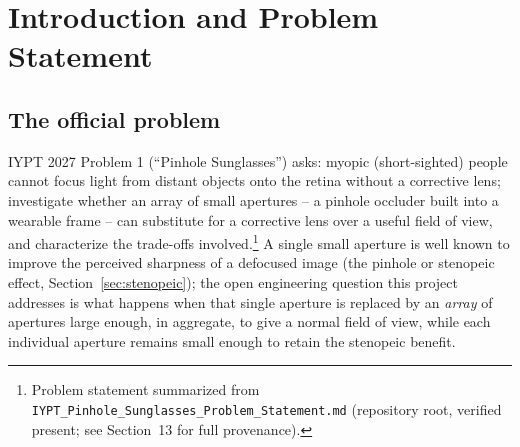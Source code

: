 \documentclass[11pt]{report}
\begin{document}
\tableofcontents
\listoffigures
\listoftables

\chapter{Introduction and Problem Statement}
\label{ch:intro}

\section{The official problem}
IYPT 2027 Problem 1 (``Pinhole Sunglasses'') asks: myopic (short-sighted) people cannot
focus light from distant objects onto the retina without a corrective lens; investigate
whether an array of small apertures -- a pinhole occluder built into a wearable frame --
can substitute for a corrective lens over a useful field of view, and characterize the
trade-offs involved.\footnote{Problem statement summarized from
\texttt{IYPT\_Pinhole\_Sunglasses\_Problem\_Statement.md} (repository root, verified
present; see Section~13 for full provenance).} A single small aperture is well known to
improve the perceived sharpness of a defocused image (the pinhole or stenopeic effect,
Section~\ref{sec:stenopeic}); the open engineering question this project addresses is
what happens when that single aperture is replaced by an \emph{array} of apertures
large enough, in aggregate, to give a normal field of view, while each individual
aperture remains small enough to retain the stenopeic benefit.
\end{document}
